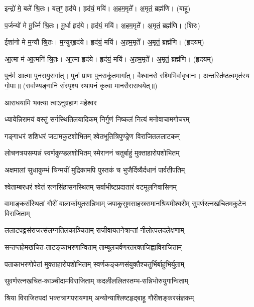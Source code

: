    इन्द्रो॑ मे॒ बले᳚ श्रि॒तः।   बल॒ꣳ॒ हृद॑ये।   हृद॑यं॒ मयि॑।   अ॒हम॒मृते᳚।   अ॒मृतं॒ ब्रह्म॑णि। (बाहू)

   प॒र्जन्यो॑ मे मू॒र्ध्नि श्रि॒तः।   मू॒र्धा हृद॑ये।   हृद॑यं॒ मयि॑।   अ॒हम॒मृते᳚।   अ॒मृतं॒ ब्रह्म॑णि। (शिरः)

   ईशा॑नो मे म॒न्यौ श्रि॒तः।   म॒न्युर्‌हृद॑ये।   हृद॑यं॒ मयि॑।    अ॒हम॒मृते᳚।   अ॒मृतं॒ ब्रह्म॑णि। (हृदयम्)

   आ॒त्मा म॑ आ॒त्मनि॑ श्रि॒तः।   आ॒त्मा हृद॑ये।   हृद॑यं॒ मयि॑।   अ॒हम॒मृते᳚।   अ॒मृतं॒ ब्रह्म॑णि।
(हृदयम्)

   पुन॑र्म आ॒त्मा पुन॒रायु॒रागा᳚त्।   पुनः॑ प्रा॒णः पुन॒राकू॑त॒मागा᳚त्।   वै॒श्वा॒न॒रो र॒श्मिभि॑र्वावृधा॒नः।   अ॒न्तस्ति॑ष्ठत्व॒मृत॑स्य गो॒पाः॥ (सर्वाण्यङ्गानि संस्पृश्य स्थापनं कृत्वा मानसैराराधयेत्॥)
{\small \closesection}


{आराधयामि भक्त्या त्वाऽनुग्रहाण महेश्वर}



\twolineshloka
{ध्यायेन्निरामयं वस्तुं सर्गस्थितिलयादिकम्}
{निर्गुणं निष्कलं नित्यं मनोवाचामगोचरम्}

\twolineshloka
{गङ्गाधरं शशिधरं जटामकुटशोभितम्}
{श्वेतभूतित्रिपुण्ड्रेण विराजितललाटकम्}

\twolineshloka
{लोचनत्रयसम्पन्नं स्वर्णकुण्डलशोभितम्}
{स्मेराननं चतुर्बाहुं मुक्ताहारोपशोभितम्}

\twolineshloka
{अक्षमालां सुधाकुम्भं चिन्मयीं मुद्रिकामपि}
{पुस्तकं च भुजैर्दिव्यैर्दधानं पार्वतीपतिम्}

\twolineshloka
{श्वेताम्बरधरं श्वेतं रत्नसिंहासनस्थितम्}
{सर्वाभीष्टप्रदातारं वटमूलनिवासिनम्}

\threelineshloka
{वामाङ्कसंस्थितां गौरीं बालार्कायुतसन्निभाम्}
{जपाकुसुमसाहस्रसमानश्रियमीश्वरीम्}
{सुवर्णरत्नखचितमकुटेन विराजिताम्}

\twolineshloka
{ललाटपट्टसंराजत्संलग्नतिलकाञ्चिताम्}
{राजीवायतनेत्रान्तां नीलोत्पलदलेक्षणाम्}

\twolineshloka
{सन्तप्तहेमखचित-ताटङ्काभरणान्विताम्}
{ताम्बूलचर्वणरतरक्तजिह्वाविराजिताम्}

\twolineshloka
{पताकाभरणोपेतां मुक्ताहारोपशोभिताम्}
{स्वर्णकङ्कणसंयुक्तैश्चतुर्भिर्बाहुभिर्युताम्}

\twolineshloka
{सुवर्णरत्नखचित-काञ्चीदामविराजिताम्}
{कदलीललितस्तम्भ-सन्निभोरुयुगान्विताम्}

\twolineshloka
{श्रिया विराजितपदां भक्तत्राणपरायणाम्}
{अन्योन्याश्लिष्टहृद्बाहू गौरीशङ्करसंज्ञकम्}

